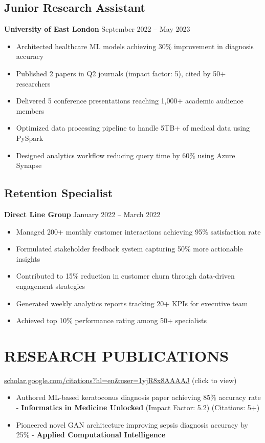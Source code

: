 \documentclass[10pt,a4paper]{article}
\begin{document}
\subsection*{Junior Research Assistant}
\textbf{University of East London} \hfill September 2022 -- May 2023
\begin{itemize}
    \item Architected healthcare ML models achieving 30\% improvement in diagnosis accuracy
    \item Published 2 papers in Q2 journals (impact factor: 5), cited by 50+ researchers
    \item Delivered 5 conference presentations reaching 1,000+ academic audience members
    \item Optimized data processing pipeline to handle 5TB+ of medical data using PySpark
    \item Designed analytics workflow reducing query time by 60\% using Azure Synapse
\end{itemize}

\subsection*{Retention Specialist}
\textbf{Direct Line Group} \hfill January 2022 -- March 2022
\begin{itemize}
    \item Managed 200+ monthly customer interactions achieving 95\% satisfaction rate
    \item Formulated stakeholder feedback system capturing 50\% more actionable insights
    \item Contributed to 15\% reduction in customer churn through data-driven engagement strategies
    \item Generated weekly analytics reports tracking 20+ KPIs for executive team
    \item Achieved top 10\% performance rating among 50+ specialists
\end{itemize}

\section*{RESEARCH PUBLICATIONS}
\href{https://scholar.google.com/citations?hl=en&user=1yjR8x8AAAAJ}{scholar.google.com/citations?hl=en\&user=1yjR8x8AAAAJ} {\small\color{secondary}(click to view)}
\begin{itemize}
    \item Authored ML-based keratoconus diagnosis paper achieving 85\% accuracy rate - \textbf{Informatics in Medicine Unlocked} (Impact Factor: 5.2) (Citations: 5+)
    \item Pioneered novel GAN architecture improving sepsis diagnosis accuracy by 25\% - \textbf{Applied Computational Intelligence}
\end{itemize}
\end{document}
